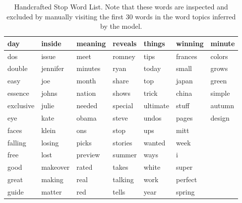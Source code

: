\documentclass[prodmode,acmtochi]{acmsmall}
\begin{document}
\begin{table}[h]
\centering
\scriptsize
\centering
\caption{Handcrafted Stop Word List. Note that these words are inspected and excluded by manually visiting the first 30 words in the word topics inferred by the model.}
\begin{tabular}{|l|l|l|l|l|l|l|}
\hline
day       & inside   & meaning & reveals & things   & winning & minute \\ \hline
dos       & issue    & meet    & romney  & tips     & frances & colors \\ \hline
double    & jennifer & minutes & ryan    & today    & small   & grows  \\ \hline
easy      & joe      & month   & share   & top      & japan   & green  \\ \hline
essence   & johns    & nation  & shows   & trick    & china   & simple \\ \hline
exclusive & julie    & needed  & special & ultimate & stuff   & autumn \\ \hline
eye       & kate     & obama   & steve   & undos    & pages   & design \\ \hline
faces     & klein    & ons     & stop    & ups      & mitt    &        \\ \hline
falling   & losing   & picks   & stories & wanted   & week    &        \\ \hline
free      & lost     & preview & summer  & ways     & i       &        \\ \hline
good      & makeover & rated   & takes   & white    & super   &        \\ \hline
great     & making   & real    & talking & work     & perfect &        \\ \hline
guide     & matter   & red     & tells   & year     & spring  &        \\ \hline
\end{tabular}
\end{table}
\normalsize  \label{table:stop_words}



\end{document}
